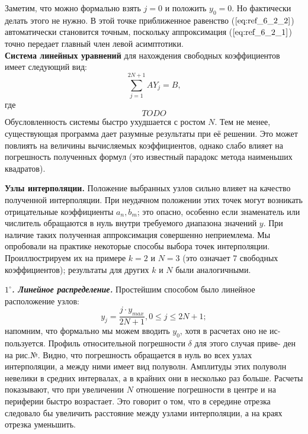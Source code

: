 Заметим, что можно формально взять $j=0$ и положить $y_0 = 0$. Но фактически делать этого
не нужно. В этой точке приближенное равенство ($\ref{eq:ref_6_2_2}$) автоматически становится точным, поскольку аппроксимация ($\ref{eq:ref_6_2_1}$) точно передает главный член левой асимптотики.
\\

\textbf{Система линейных уравнений} для нахождения свободных коэффициентов имеет следующий вид:
\begin{equation}
\sum\limits_{j=1}^{2N+1} AY_j = B,
\label{eq:ref_6_2_3}
\end{equation}
где
\begin{equation}
TODO
\label{eq:ref_6_2_4}
\end{equation}
Обусловленность системы быстро ухудшается с ростом $N$. Тем не менее,
существующая программа дает разумные результаты при её решении. Это может повлиять на величины вычисляемых коэффициентов, однако слабо влияет на погрешность полученных формул (это известный парадокс метода наименьших квадратов). 

\textbf{Узлы интерполяции.} Положение выбранных узлов сильно влияет на качество полученной интерполяции.
При неудачном положении этих точек могут возникать отрицательные коэффициенты  $a_n, b_m$; это опасно, особенно если знаменатель или числитель обращаются в нуль внутри требуемого диапазона значений $y$.
При наличие таких полученная аппроксимация совершенно неприемлема.
Мы опробовали на практике некоторые способы выбора точек интерполяции. Проиллюстрируем их на примере $k = 2$ и $N = 3$ (это означает 7 свободных коэффициентов); результаты для других $k$ и $N$ были аналогичными.

\textbf{\textit{$1^{\circ}$. Линейное распределение.}} Простейшим способом было линейное
расположение узлов:
\begin{equation}
y_j = \frac{j \cdot y_{max}}{2N+1}, 0 \leqslant j \leqslant 2N +1;
\label{eq:ref_6_2_5}
\end{equation}
напомним, что формально мы можем вводить $y_0$, хотя в расчетах оно не ис-
пользуется. Профиль относительной погрешности $\delta$ для этого случая приве-
ден на рис.№. Видно, что погрешность обращается в нуль во всех узлах интерполяции, а между ними имеет вид полуволн. Амплитуды этих полуволн невелики в средних интервалах, а в крайних они в несколько раз
больше. Расчеты показывают, что при увеличении $N$ отношение погрешности в центре и на периферии быстро возрастает. Это говорит о том, что в середине отрезка следовало бы увеличить расстояние между узлами интерполяции, а на краях отрезка уменьшить.

